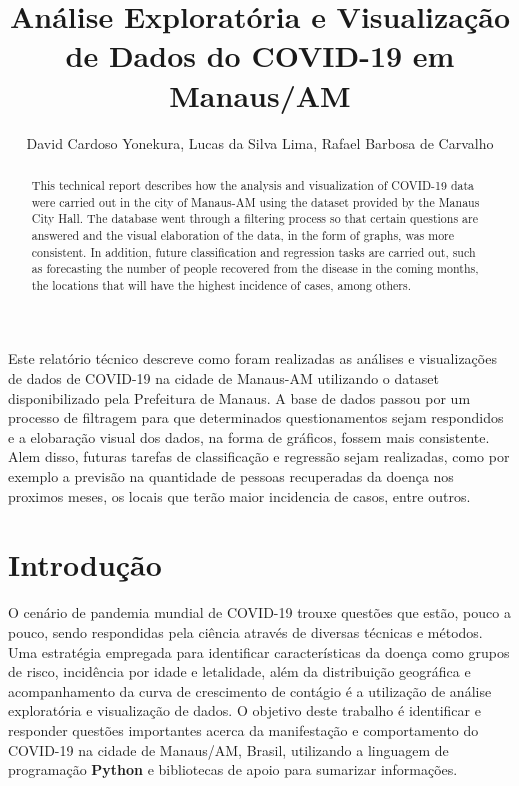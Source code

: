 \documentclass[12pt]{article}
\title{Análise Exploratória e Visualização de Dados do COVID-19 em Manaus/AM}
\author{David Cardoso Yonekura, Lucas da Silva Lima, Rafael Barbosa de Carvalho}
\begin{document}
 

\maketitle

\begin{abstract}
    
This technical report describes how the analysis and visualization of COVID-19 data were carried out in the city of Manaus-AM using the dataset provided by the Manaus City Hall. The database went through a filtering process so that certain questions are answered and the visual elaboration of the data, in the form of graphs, was more consistent. In addition, future classification and regression tasks are carried out, such as forecasting the number of people recovered from the disease in the coming months, the locations that will have the highest incidence of cases, among others.
\end{abstract}
     
\begin{resumo} 
  Este relatório técnico descreve como foram realizadas as análises e visualizações de dados de COVID-19 na cidade de Manaus-AM utilizando o dataset disponibilizado pela Prefeitura de Manaus. A base de dados passou por um processo de filtragem para que determinados questionamentos sejam respondidos e a elobaração visual dos dados, na forma de gráficos, fossem mais consistente. Alem disso, futuras tarefas de classificação e regressão sejam realizadas, como por exemplo a previsão na quantidade de pessoas recuperadas da doença nos proximos meses, os locais que terão maior incidencia de casos, entre outros.
\end{resumo}


\section{Introdução}
O cenário de pandemia mundial de COVID-19 \cite{oms} trouxe questões que estão, pouco a pouco, sendo respondidas pela ciência através de diversas técnicas e métodos. Uma estratégia empregada para identificar características da doença como grupos de risco, incidência por idade e letalidade, além da distribuição geográfica e acompanhamento da curva de crescimento de contágio é a utilização de análise exploratória e visualização de dados. O objetivo deste trabalho é identificar e responder questões importantes acerca da manifestação e comportamento do COVID-19 na cidade de Manaus/AM, Brasil, utilizando a linguagem de programação \textbf{Python} e bibliotecas de apoio para sumarizar informações.
\end{document}
